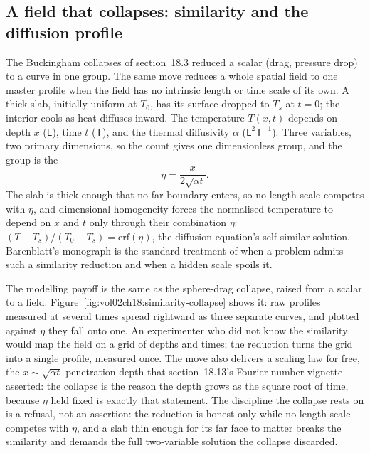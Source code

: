 \subsection{A field that collapses: similarity and the diffusion profile}

The Buckingham collapses of section~18.3 reduced a scalar (drag, pressure
drop) to a curve in one group. The same move reduces a whole spatial field to
one master profile when the field has no intrinsic length or time scale of its
own. A thick slab, initially uniform at $T_0$, has its surface dropped to
$T_s$ at $t=0$; the interior cools as heat diffuses inward. The temperature
$T(x,t)$ depends on depth $x$ ($\mathsf{L}$), time $t$ ($\mathsf{T}$), and the
thermal diffusivity $\alpha$ ($\mathsf{L}^2\mathsf{T}^{-1}$). Three variables,
two primary dimensions, so the count gives one dimensionless group, and the
group is the 
\[
\eta = \frac{x}{2\sqrt{\alpha t}}.
\]
The slab is thick enough that no far boundary enters, so no length scale
competes with $\eta$, and dimensional homogeneity forces the normalised
temperature to depend on $x$ and $t$ only through their combination $\eta$:
$(T - T_s)/(T_0 - T_s) = \mathrm{erf}(\eta)$, the diffusion equation's
self-similar solution. Barenblatt's monograph
\cite{text:barenblatt1996} is the standard treatment of when a problem admits
such a similarity reduction and when a hidden scale spoils it.

The modelling payoff is the same as the sphere-drag collapse, raised from a
scalar to a field. Figure~\ref{fig:vol02ch18:similarity-collapse} shows it: raw
profiles measured at several times spread rightward as three separate curves,
and plotted against $\eta$ they fall onto one. An experimenter who did not know
the similarity would map the field on a grid of depths and times; the reduction
turns the grid into a single profile, measured once. The move also delivers a
scaling law for free, the $x\sim\sqrt{\alpha t}$ penetration depth that
section~18.13's Fourier-number vignette asserted: the collapse is the reason the
depth grows as the square root of time, because $\eta$ held fixed is exactly that
statement. The discipline the collapse rests on is a refusal, not an assertion:
the reduction is honest only while no length scale competes with $\eta$, and a
slab thin enough for its far face to matter breaks the similarity and demands the
full two-variable solution the collapse discarded.



